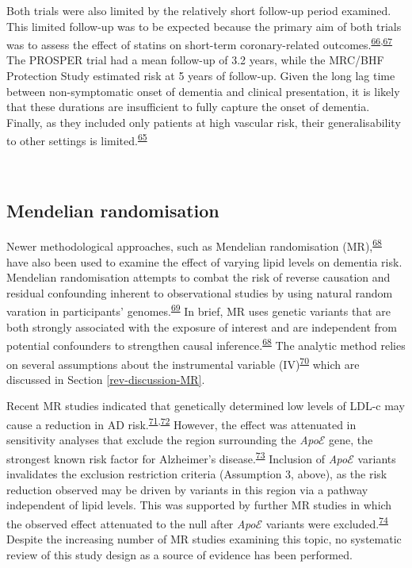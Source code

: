 \documentclass[a4paper, twoside]{templates/ociamthesis}
\begin{document}
Both trials were also limited by the relatively short follow-up period examined. This limited follow-up was to be expected because the primary aim of both trials was to assess the effect of statins on short-term coronary-related outcomes.\textsuperscript{\protect\hyperlink{ref-trompet2010}{66},\protect\hyperlink{ref-heartprotectionstudycollaborativegroup2002}{67}} The PROSPER trial had a mean follow-up of 3.2 years, while the MRC/BHF Protection Study estimated risk at 5 years of follow-up. Given the long lag time between non-symptomatic onset of dementia and clinical presentation, it is likely that these durations are insufficient to fully capture the onset of dementia. Finally, as they included only patients at high vascular risk, their generalisability to other settings is limited.\textsuperscript{\protect\hyperlink{ref-mcguinness2016}{65}}

~

\hypertarget{mendelian-randomisation}{%
\subsection{Mendelian randomisation}\label{mendelian-randomisation}}

Newer methodological approaches, such as Mendelian randomisation (MR),\textsuperscript{\protect\hyperlink{ref-daveysmith2014}{68}} have also been used to examine the effect of varying lipid levels on dementia risk. Mendelian randomisation attempts to combat the risk of reverse causation and residual confounding inherent to observational studies by using natural random varation in participants' genomes.\textsuperscript{\protect\hyperlink{ref-greenland2000}{69}} In brief, MR uses genetic variants that are both strongly associated with the exposure of interest and are independent from potential confounders to strengthen causal inference.\textsuperscript{\protect\hyperlink{ref-daveysmith2014}{68}} The analytic method relies on several assumptions about the instrumental variable (IV)\textsuperscript{\protect\hyperlink{ref-davies2018}{70}} which are discussed in Section \ref{rev-discussion-MR}.

Recent MR studies indicated that genetically determined low levels of LDL-c may cause a reduction in AD risk.\textsuperscript{\protect\hyperlink{ref-larsson2017}{71},\protect\hyperlink{ref-ostergaard2015}{72}} However, the effect was attenuated in sensitivity analyses that exclude the region surrounding the \emph{Apo}\(\mathcal{E}\) gene, the strongest known risk factor for Alzheimer's disease.\textsuperscript{\protect\hyperlink{ref-kim2009}{73}} Inclusion of \emph{Apo}\(\mathcal{E}\) variants invalidates the exclusion restriction criteria (Assumption 3, above), as the risk reduction observed may be driven by variants in this region via a pathway independent of lipid levels. This was supported by further MR studies in which the observed effect attenuated to the null after \emph{Apo}\(\mathcal{E}\) variants were excluded.\textsuperscript{\protect\hyperlink{ref-benn2017}{74}} Despite the increasing number of MR studies examining this topic, no systematic review of this study design as a source of evidence has been performed.
\end{document}
